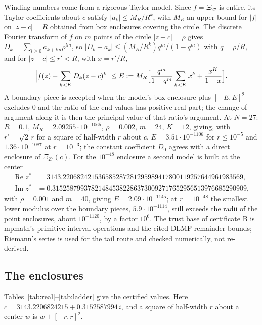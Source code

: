 \documentclass[11pt]{article}
\theoremstyle{plain}
\theoremstyle{definition}
\theoremstyle{remark}
\newcommand{\re}{\operatorname{Re}}
\newcommand{\im}{\operatorname{Im}}
\begin{document}
Winding numbers come from a rigorous Taylor model. Since $f = \Xi_{27}$ is
entire, its Taylor coefficients about $c$ satisfy $|a_k| \le M_R/R^k$, with
$M_R$ an upper bound for $|f|$ on $|z - c| = R$ obtained from box enclosures
covering the circle. The discrete Fourier transform of $f$ on $m$ points of the
circle $|z - c| = \rho$ gives $D_k = \sum_{l\ge0}a_{k+lm}\rho^{lm}$, so
$|D_k - a_k| \le (M_R/R^k)q^m/(1 - q^m)$ with $q = \rho/R$, and for
$|z - c| \le r' < R$, with $x = r'/R$,
\[
\Bigl|f(z) - \sum_{k<K}D_k(z-c)^k\Bigr| \le E :=
M_R\Bigl[\frac{q^m}{1-q^m}\sum_{k<K}x^k + \frac{x^K}{1-x}\Bigr].
\]
A boundary piece is accepted when the model's box enclosure plus $[-E,E]^2$
excludes $0$ and the ratio of the end values has positive real part; the change
of argument along it is then the principal value of that ratio's argument. At
$N = 27$: $R = 0.1$, $M_R = 2.09255\cdot10^{-1065}$, $\rho = 0.002$, $m = 24$,
$K = 12$, giving, with $r' = \sqrt2\,r$ for a square of half-width $r$ about $c$,
$E = 3.51\cdot10^{-1106}$ for $r \le 10^{-5}$ and
$1.36\cdot10^{-1087}$ at $r = 10^{-3}$; the constant coefficient $D_0$ agrees
with a direct enclosure of $\Xi_{27}(c)$. For the $10^{-48}$ enclosure a
second model is built at the center
\begin{align*}
\re z^* &= 3143.220682421536585287281295989417800119257644961983569,\\
\im z^* &= 0.3152587993782148453822863730092717652956513976685290909,
\end{align*}
with $\rho = 0.001$ and $m = 40$, giving $E = 2.09\cdot10^{-1145}$; at
$r = 10^{-48}$ the smallest lower modulus over the boundary pieces,
$5.9\cdot10^{-1114}$, still exceeds the radii of the point enclosures, about
$10^{-1120}$, by a factor $10^6$. The trust base of certificate B is mpmath's
primitive interval operations and the cited DLMF remainder bounds; Riemann's
series is used for the tail route and checked numerically, not re-derived.

\subsection{The enclosures}

Tables~\ref{tab:real}--\ref{tab:ladder} give the certified values. Here
$c = 3143.2206824215 + 0.3152587994\,i$, and a square of half-width $r$ about a
center $w$ is $w + [-r, r]^2$.
\end{document}
